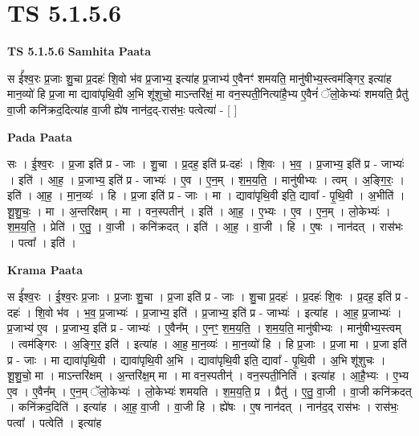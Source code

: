 \documentclass[17pt]{extarticle}
\begin{document}
\section{ TS 5.1.5.6 }

\textbf{TS 5.1.5.6 } \newline
\textbf{Samhita Paata} \newline

स ई᳚श्व॒रः प्र॒जाः शु॒चा प्र॒दहः॑ शि॒वो भ॑व प्र॒जाभ्य॒ इत्या॑ह प्र॒जाभ्य॑ ए॒वैनꣳ॑ शमयति॒ मानु॑षीभ्य॒स्त्वम॑ङ्गिर॒ इत्या॑ह मान॒व्यो॑ हि प्र॒जा मा द्यावा॑पृथि॒वी अ॒भि शू॑शुचो॒ माऽन्तरि॑क्षं॒ मा वन॒स्पती॒नित्या॑है॒भ्य ए॒वैनं॑ ॅलो॒केभ्यः॑ शमयति॒ प्रैतु॑ वा॒जी कनि॑क्रद॒दित्या॑ह वा॒जी ह्ये॑ष नान॑द॒द्-रास॑भः॒ पत्वेत्या॑ - [  ] \newline

\textbf{Pada Paata} \newline

सः । ई॒श्व॒रः । प्र॒जा इति॑ प्र - जाः । शु॒चा । प्र॒दह॒ इति॑ प्र-दहः॑ । शि॒वः । भ॒व॒ । प्र॒जाभ्य॒ इति॑ प्र - जाभ्यः॑ । इति॑ । आ॒ह॒ । प्र॒जाभ्य॒ इति॑ प्र - जाभ्यः॑ । ए॒व । ए॒न॒म् । श॒म॒य॒ति॒ । मानु॑षीभ्यः । त्वम् । अ॒ङ्गि॒रः॒ । इति॑ । आ॒ह॒ । मा॒न॒व्यः॑ । हि । प्र॒जा इति॑ प्र - जाः । मा । द्यावा॑पृथि॒वी इति॒ द्यावा᳚ - पृ॒थि॒वी । अ॒भीति॑ । शू॒शु॒चः॒ । मा । अ॒न्तरि॑क्षम् । मा । वन॒स्पतीन्॑ । इति॑ । आ॒ह॒ । ए॒भ्यः । ए॒व । ए॒न॒म् । लो॒केभ्यः॑ । श॒म॒य॒ति॒ । प्रेति॑ । ए॒तु॒ । वा॒जी । कनि॑क्रदत् । इति॑ । आ॒ह॒ । वा॒जी । हि । ए॒षः । नान॑दत् । रास॑भः । पत्वा᳚ । इति॑ ।  \newline


\textbf{Krama Paata} \newline

स ई᳚श्व॒रः । ई॒श्व॒रः प्र॒जाः । प्र॒जाः शु॒चा । प्र॒जा इति॑ प्र - जाः । शु॒चा प्र॒दहः॑ । प्र॒दहः॑ शि॒वः । प्र॒दह॒ इति॑ प्र - दहः॑ । शि॒वो भ॑व । भ॒व॒ प्र॒जाभ्यः॑ । प्र॒जाभ्य॒ इति॑ । प्र॒जाभ्य॒ इति॑ प्र - जाभ्यः॑ । इत्या॑ह । आ॒ह॒ प्र॒जाभ्यः॑ । प्र॒जाभ्य॑ ए॒व । प्र॒जाभ्य॒ इति॑ प्र - जाभ्यः॑ । ए॒वैन᳚म् । ए॒नꣳ॒॒ श॒म॒य॒ति॒ । श॒म॒य॒ति॒ मानु॑षीभ्यः । मानु॑षीभ्य॒स्त्वम् । त्वम॑ङ्गिरः । अ॒ङ्गि॒र॒ इति॑ । इत्या॑ह । आ॒ह॒ मा॒न॒व्यः॑ । मा॒न॒व्यो॑ हि । हि प्र॒जाः । प्र॒जा मा । प्र॒जा इति॑ प्र - जाः । मा द्यावा॑पृथि॒वी । द्यावा॑पृथि॒वी अ॒भि । द्यावा॑पृथि॒वी इति॒ द्यावा᳚ - पृ॒थि॒वी । अ॒भि शू॑शुचः । शू॒शु॒चो॒ मा । माऽन्तरि॑क्षम् । अ॒न्तरि॑क्ष॒म् मा । मा वन॒स्पतीन्॑ । वन॒स्पती॒निति॑ । इत्या॑ह । आ॒है॒भ्यः । ए॒भ्य ए॒व । ए॒वैन᳚म् । ए॒न॒म् ॅलो॒केभ्यः॑ । लो॒केभ्यः॑ शमयति । श॒म॒य॒ति॒ प्र । प्रैतु॑ । ए॒तु॒ वा॒जी । वा॒जी कनि॑क्रदत् । कनि॑क्रद॒दिति॑ । इत्या॑ह । आ॒ह॒ वा॒जी । वा॒जी हि । ह्ये॑षः । ए॒ष नान॑दत् । नान॑द॒द् रास॑भः । रास॑भः॒ पत्वा᳚ । पत्वेति॑ । इत्या॑ह \newline
\end{document}
